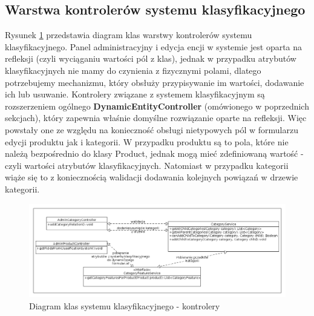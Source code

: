 \subsection{Warstwa kontrolerów systemu klasyfikacyjnego}
Rysunek \ref{klasy_kontrolery_sysKlas} przedstawia diagram klas warstwy kontrolerów systemu klasyfikacyjnego. Panel administracyjny i edycja encji w systemie jest oparta na refleksji (czyli wyciąganiu wartości pól z klas), jednak w przypadku atrybutów klasyfikacyjnych nie mamy do czynienia z fizycznymi polami, dlatego potrzebujemy mechanizmu, który obsłuży przypisywanie im wartości, dodawanie ich lub usuwanie. Kontrolery związane z systemem klasyfikacyjnym są rozszerzeniem ogólnego \textbf{DynamicEntityController} (omówionego w poprzednich sekcjach), który zapewnia właśnie domyślne rozwiązanie oparte na refleksji. Więc powstały one ze względu na konieczność obsługi nietypowych pól w formularzu edycji produktu jak i kategorii. W przypadku produktu są to pola, które nie należą bezpośrednio do klasy Product, jednak mogą mieć zdefiniowaną wartość - czyli wartości atrybutów klasyfikacyjnych. Natomiast w przypadku kategorii wiąże się to z koniecznością walidacji dodawania kolejnych powiązań w drzewie kategorii. 
\begin{figure}
	\begin{center}
		\includegraphics[scale=0.4]{klasy_kontrolery_sysKlas.png}
	\end{center}
	\caption{{\color{black}Diagram klas systemu klasyfikacyjnego - kontrolery}} \label{klasy_kontrolery_sysKlas}
\end{figure}

